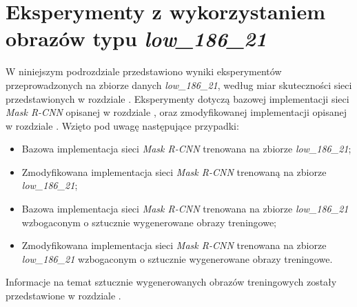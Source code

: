 \section{Eksperymenty z wykorzystaniem obrazów typu \textit{low\_186\_21}}
\label{sec:experymenty_low}
W niniejszym podrozdziale przedstawiono wyniki eksperymentów przeprowadzonych na zbiorze danych \textit{low\_186\_21}, według miar skuteczności sieci przedstawionych w rozdziale .
Eksperymenty dotyczą bazowej implementacji sieci \textit{Mask R-CNN} \cite{matterport-mask-rcnn} opisanej w rozdziale , oraz zmodyfikowanej implementacji opisanej w rozdziale .
 Wzięto pod uwagę następujące przypadki:

\begin{itemize}
 \item Bazowa implementacja sieci \textit{Mask R-CNN} trenowana na zbiorze \textit{low\_186\_21};
 \item Zmodyfikowana implementacja sieci \textit{Mask R-CNN} trenowaną na zbiorze \textit{low\_186\_21};
 \item Bazowa implementacja sieci \textit{Mask R-CNN} trenowana na zbiorze \textit{low\_186\_21} wzbogaconym o sztucznie wygenerowane obrazy treningowe;
 \item Zmodyfikowana implementacja sieci \textit{Mask R-CNN} trenowana na zbiorze \textit{low\_186\_21} wzbogaconym o sztucznie wygenerowane obrazy treningowe.
\end{itemize}

Informacje na temat sztucznie wygenerowanych obrazów treningowych zostały przedstawione w rozdziale .
